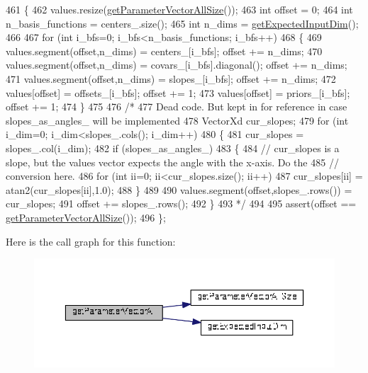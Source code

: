 \begin{DoxyCode}
461 \{
462   values.resize(\hyperlink{classDmpBbo_1_1UnifiedModel_ab24d2485b3b795b516f4844f225100eb}{getParameterVectorAllSize}());
463   \textcolor{keywordtype}{int} offset = 0;
464   \textcolor{keywordtype}{int} n\_basis\_functions = centers\_.size();
465   \textcolor{keywordtype}{int} n\_dims = \hyperlink{classDmpBbo_1_1UnifiedModel_af5a550bcf65d5a29a153a594cc4e3fa1}{getExpectedInputDim}();
466   
467   \textcolor{keywordflow}{for} (\textcolor{keywordtype}{int} i\_bfs=0; i\_bfs<n\_basis\_functions; i\_bfs++)
468   \{
469     values.segment(offset,n\_dims) = centers\_[i\_bfs];              offset += n\_dims;
470     values.segment(offset,n\_dims) = covars\_[i\_bfs].diagonal();    offset += n\_dims;
471     values.segment(offset,n\_dims) = slopes\_[i\_bfs];               offset += n\_dims;
472     values[offset]                = offsets\_[i\_bfs];              offset += 1;
473     values[offset]                = priors\_[i\_bfs];               offset += 1;
474   \}
475   
476   \textcolor{comment}{/*}
477 \textcolor{comment}{  Dead code. But kept in for reference in case slopes\_as\_angles\_ will be implemented}
478 \textcolor{comment}{  VectorXd cur\_slopes;}
479 \textcolor{comment}{  for (int i\_dim=0; i\_dim<slopes\_.cols(); i\_dim++)}
480 \textcolor{comment}{  \{}
481 \textcolor{comment}{    cur\_slopes = slopes\_.col(i\_dim);}
482 \textcolor{comment}{    if (slopes\_as\_angles\_)}
483 \textcolor{comment}{    \{}
484 \textcolor{comment}{      // cur\_slopes is a slope, but the values vector expects the angle with the x-axis. Do the }
485 \textcolor{comment}{      // conversion here.}
486 \textcolor{comment}{      for (int ii=0; ii<cur\_slopes.size(); ii++)}
487 \textcolor{comment}{        cur\_slopes[ii] = atan2(cur\_slopes[ii],1.0);}
488 \textcolor{comment}{    \}}
489 \textcolor{comment}{    }
490 \textcolor{comment}{    values.segment(offset,slopes\_.rows()) = cur\_slopes;}
491 \textcolor{comment}{    offset += slopes\_.rows();}
492 \textcolor{comment}{  \}}
493 \textcolor{comment}{    */}
494   
495   assert(offset == \hyperlink{classDmpBbo_1_1UnifiedModel_ab24d2485b3b795b516f4844f225100eb}{getParameterVectorAllSize}());   
496 \};
\end{DoxyCode}


Here is the call graph for this function\+:
\nopagebreak
\begin{figure}[H]
\begin{center}
\leavevmode
\includegraphics[width=350pt]{classDmpBbo_1_1UnifiedModel_a29429ff2771d1e56cfba7250d38da4b1_cgraph}
\end{center}
\end{figure}


